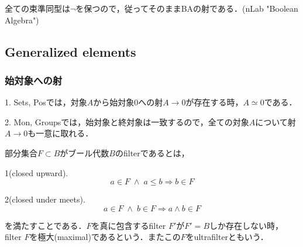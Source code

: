 \documentclass[uplatex, 12pt, dvipdfmx]{jsarticle}
\begin{document}
\begin{proposition*}
    全ての束準同型は$\lnot$を保つので，従ってそのままBAの射である．(nLab "Boolean Algebra")
\end{proposition*}

\subsection{Generalized elements}\label{subsection-generalized-elements}

\subsubsection*{始対象への射}

\begin{example*}
    1. Sets, Posでは，対象$A$から始対象$0$への射$A\to 0$が存在する時，$A\simeq 0$である．

    2. Mon, Groupsでは，始対象と終対象は一致するので，全ての対象$A$について射$A\to 0$も一意に取れる．
\end{example*}

\begin{definition*}[ultrafilter]
    部分集合$F\subset B$がブール代数$B$のfilterであるとは，

    1(closed upward). \begin{equation}\label{formula-BAfilter-closed-upward}
        a\in F\;\land\; a\le b\Rightarrow b\in F
    \end{equation}

    2(closed under meets). \begin{equation}\label{formula-BAfilter-closed-under-meets}
        a\in F\;\land\; b\in F\Rightarrow a\land b\in F
    \end{equation}
    
    を満たすことである．$F$を真に包含するfilter $F'$が$F'=B$しか存在しない時，filter $F$を極大(maximal)であるという．またこの$F$をultrafilterともいう．
\end{definition*}
\end{document}
